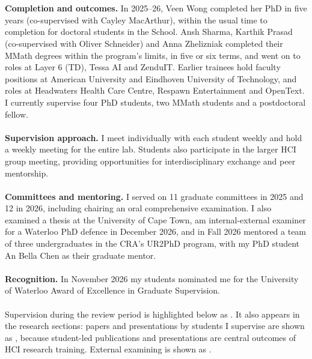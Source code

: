 \documentclass[11pt]{article}
\begin{document}
\\ \\
\textbf{Completion and outcomes.} In 2025--26, Veen Wong completed her PhD in five years (co-supervised with Cayley MacArthur), within the usual time to completion for doctoral students in the School. Ansh Sharma, Karthik Prasad (co-supervised with Oliver Schneider) and Anna Zhelizniak completed their MMath degrees within the program's limits, in five or six terms, and went on to roles at Layer 6 (TD), Tessa AI and ZenduIT. Earlier trainees hold faculty positions at American University and Eindhoven University of Technology, and roles at Headwaters Health Care Centre, Respawn Entertainment and OpenText. I currently supervise four PhD students, two MMath students and a postdoctoral fellow.
\\ \\
\textbf{Supervision approach.} I meet individually with each student weekly and hold a weekly meeting for the entire lab. Students also participate in the larger HCI group meeting, providing opportunities for interdisciplinary exchange and peer mentorship.
\\ \\
\textbf{Committees and mentoring.} I served on 11 graduate committees in 2025 and 12 in 2026, including chairing an oral comprehensive examination. I also examined a thesis at the University of Cape Town, am internal-external examiner for a Waterloo PhD defence in December 2026, and in Fall 2026 mentored a team of three undergraduates in the CRA's UR2PhD program, with my PhD student An Bella Chen as their graduate mentor.
\\ \\
\textbf{Recognition.} In November 2026 my students nominated me for the University of Waterloo Award of Excellence in Graduate Supervision.
\\ \\
Supervision during the review period is highlighted below as . It also appears in the research sections: papers and presentations by students I supervise are shown as , because student-led publications and presentations are central outcomes of HCI research training. External examining is shown as .
\\ \\
\fi %
\keepwithnext[6]
\end{document}
